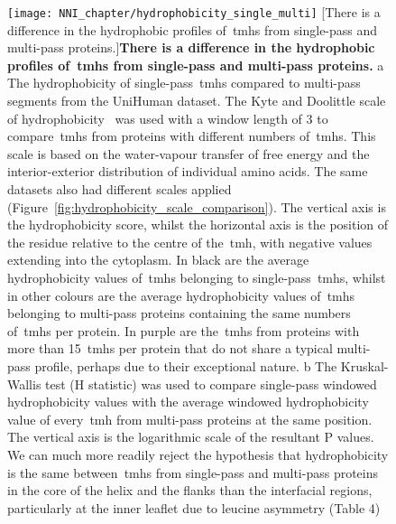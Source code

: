 \begin{figure}[!ht]
\centering
\texttt{[image: NNI\_chapter/hydrophobicity\_single\_multi]}
[There is a difference in the hydrophobic profiles of~\gls{tmh}s from single-pass and multi-pass proteins.]{\textbf{There is a difference in the hydrophobic profiles of~\gls{tmh}s from single-pass and multi-pass proteins.}
 a The hydrophobicity of single-pass~\gls{tmh}s compared to multi-pass segments from the UniHuman dataset.
The Kyte and Doolittle scale of hydrophobicity~\cite{Kyte1982} was used with a window length of 3 to compare~\gls{tmh}s from proteins with different numbers of~\gls{tmh}s.
This scale is based on the water-vapour transfer of free energy and the interior-exterior distribution of individual amino acids.
The same datasets also had different scales applied (Figure~\ref{fig:hydrophobicity_scale_comparison}).
The vertical axis is the hydrophobicity score, whilst the horizontal axis is the position of the residue relative to the centre of the~\gls{tmh}, with negative values extending into the cytoplasm.
In black are the average hydrophobicity values of~\gls{tmh}s belonging to single-pass~\gls{tmh}s, whilst in other colours are the average hydrophobicity values of~\gls{tmh}s belonging to multi-pass proteins containing the same numbers of~\gls{tmh}s per protein.
In purple are the~\gls{tmh}s from proteins with more than 15~\gls{tmh}s per protein that do not share a typical multi-pass profile, perhaps due to their exceptional nature.
b The Kruskal-Wallis test (H statistic) was used to compare single-pass windowed hydrophobicity values with the average windowed hydrophobicity value of every~\gls{tmh} from multi-pass proteins at the same position.
The vertical axis is the logarithmic scale of the resultant P values.
We can much more readily reject the hypothesis that hydrophobicity is the same between~\gls{tmh}s from single-pass and multi-pass proteins in the core of the helix and the flanks than the interfacial regions, particularly at the inner leaflet due to leucine asymmetry (Table 4)}

\label{fig:hydrophobicity_single_multi}
\end{figure}


